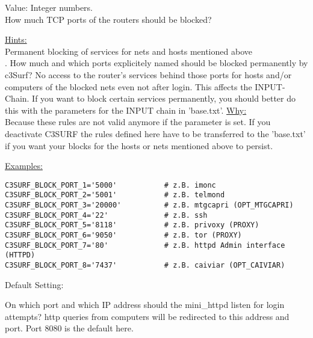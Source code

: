 \begin{itemize}
\begin{description}


  Value: Integer numbers.\\
  How much TCP ports of the routers should be blocked?

   \underline{Hints:}\\
   Permanent blocking of services for nets and hosts mentioned above\\
   . How much
   and which ports explicitely named should be blocked permanently by c3Surf?
   No access to the router's services behind those ports for hosts and/or computers
   of the blocked nets even not after login. This affects the INPUT-Chain.
   If you want to block certain services permanently, you should better
   do this with the parameters for the INPUT chain in 'base.txt'.
   \underline{Why:}\\
   Because these rules are not valid anymore if the parameter
    is set. If you deactivate C3SURF
   the rules defined here have to be transferred to the 'base.txt' if you
   want your blocks for the hosts or nets mentioned above to persist.




\underline{Examples:}
\begin{example}
\begin{verbatim}
C3SURF_BLOCK_PORT_1='5000'           # z.B. imonc
C3SURF_BLOCK_PORT_2='5001'           # z.B. telmond
C3SURF_BLOCK_PORT_3='20000'          # z.B. mtgcapri (OPT_MTGCAPRI)
C3SURF_BLOCK_PORT_4='22'             # z.B. ssh
C3SURF_BLOCK_PORT_5='8118'           # z.B. privoxy (PROXY)
C3SURF_BLOCK_PORT_6='9050'           # z.B. tor (PROXY)
C3SURF_BLOCK_PORT_7='80'             # z.B. httpd Admin interface (HTTPD)
C3SURF_BLOCK_PORT_8='7437'           # z.B. caiviar (OPT_CAIVIAR)
\end{verbatim}
\end{example}


  Default Setting: 

  On which port and which IP address should the mini\_httpd listen for
  login attempts? http queries from computers will be redirected to
  this address and port. Port 8080 is the default here.


\end{description}
\end{itemize}
